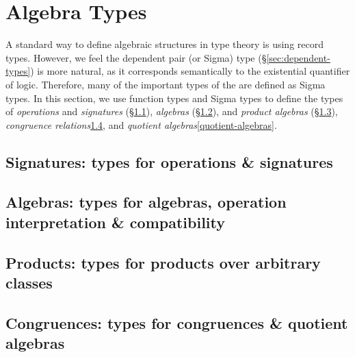 \section{Algebra Types}\label{sec:algebra-types}
A standard way to define algebraic structures in type theory is using record types.  However, we feel the dependent pair (or Sigma) type (\S\ref{sec:dependent-types}) is more natural, as it corresponds semantically to the existential quantifier of logic. Therefore, many of the important types of the \ualib are defined as Sigma types. In this section, we use function types and Sigma types to define the types of \emph{operations} and \emph{signatures} (\S\ref{sec:oper-sign}), \emph{algebras} (\S\ref{sec:algebras}), and \emph{product algebras} (\S\ref{sec:product-algebras}), \emph{congruence relations}\ref{congruences}, and \emph{quotient algebras}\ref{quotient-algebras}.

\subsection{Signatures: types for operations \& signatures}\label{sec:oper-sign}


\subsection{Algebras: types for algebras, operation interpretation \& compatibility}\label{sec:algebras}


\subsection{Products: types for products over arbitrary classes}\label{sec:product-algebras}


\subsection{Congruences: types for congruences \& quotient algebras}\label{congruences}

